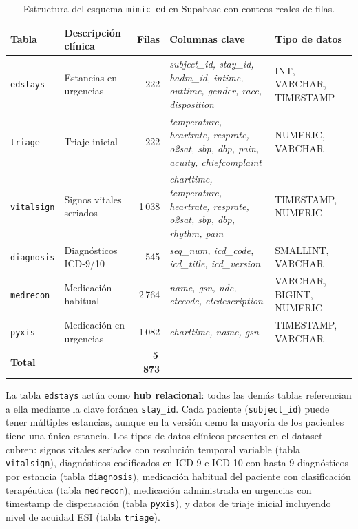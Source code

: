 \begin{table}[t]
\centering
\caption{Estructura del esquema \texttt{mimic\_ed} en Supabase con conteos reales de filas.}
\label{tab:mimic_estructura}
\footnotesize
\begin{tabularx}{\textwidth}{llrXl}
\toprule
\textbf{Tabla} & \textbf{Descripción clínica} & \textbf{Filas} & \textbf{Columnas clave} & \textbf{Tipo de datos} \\
\midrule
\texttt{edstays} & Estancias en urgencias & 222 & \textit{subject\_id, stay\_id, hadm\_id, intime, outtime, gender, race, disposition} & INT, VARCHAR, TIMESTAMP \\
\addlinespace
\texttt{triage} & Triaje inicial & 222 & \textit{temperature, heartrate, resprate, o2sat, sbp, dbp, pain, acuity, chiefcomplaint} & NUMERIC, VARCHAR \\
\addlinespace
\texttt{vitalsign} & Signos vitales seriados & 1\,038 & \textit{charttime, temperature, heartrate, resprate, o2sat, sbp, dbp, rhythm, pain} & TIMESTAMP, NUMERIC \\
\addlinespace
\texttt{diagnosis} & Diagnósticos ICD-9/10 & 545 & \textit{seq\_num, icd\_code, icd\_title, icd\_version} & SMALLINT, VARCHAR \\
\addlinespace
\texttt{medrecon} & Medicación habitual & 2\,764 & \textit{name, gsn, ndc, etccode, etcdescription} & VARCHAR, BIGINT, NUMERIC \\
\addlinespace
\texttt{pyxis} & Medicación en urgencias & 1\,082 & \textit{charttime, name, gsn} & TIMESTAMP, VARCHAR \\
\midrule
\multicolumn{2}{l}{\textbf{Total}} & \textbf{5\,873} & & \\
\bottomrule
\end{tabularx}
\end{table}

La tabla \texttt{edstays} actúa como \textbf{hub relacional}: todas las demás tablas referencian a ella mediante la clave foránea \texttt{stay\_id}. Cada paciente (\texttt{subject\_id}) puede tener múltiples estancias, aunque en la versión demo la mayoría de los pacientes tiene una única estancia. Los tipos de datos clínicos presentes en el dataset cubren: signos vitales seriados con resolución temporal variable (tabla \texttt{vitalsign}), diagnósticos codificados en ICD-9 e ICD-10 con hasta 9 diagnósticos por estancia (tabla \texttt{diagnosis}), medicación habitual del paciente con clasificación terapéutica (tabla \texttt{medrecon}), medicación administrada en urgencias con timestamp de dispensación (tabla \texttt{pyxis}), y datos de triaje inicial incluyendo nivel de acuidad ESI (tabla \texttt{triage}).


